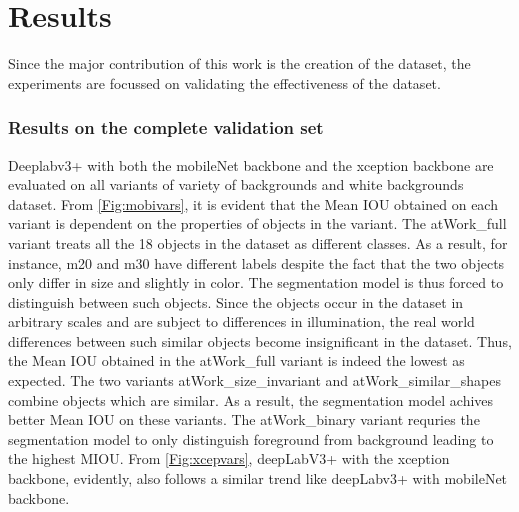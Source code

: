 
\chapter{Results}

Since the major contribution of this work is the creation of the dataset, the experiments are focussed on validating the effectiveness of the dataset. 


\subsection{Results on the complete validation set}


Deeplabv3+ with both the mobileNet backbone and the xception backbone are evaluated on all variants of variety of backgrounds and white backgrounds dataset. From \ref{Fig:mobivars}, it is evident that the Mean IOU obtained on each variant is dependent on the properties of objects in the variant. The atWork\_full variant treats all the 18 objects in the dataset as different classes. As a result, for instance, m20 and m30 have different labels despite the fact that the two objects only differ in size and slightly in color. The segmentation model is thus forced to distinguish between such objects. Since the objects occur in the dataset in arbitrary scales and are subject to differences in illumination, the real world differences between such similar objects become insignificant in the dataset. Thus, the Mean IOU obtained in the atWork\_full variant is indeed the lowest as expected. The two variants atWork\_size\_invariant and atWork\_similar\_shapes combine objects which are similar. As a result, the segmentation model achives better Mean IOU on these variants. The atWork\_binary variant requries the segmentation model to only distinguish foreground from background leading to the highest MIOU. From \ref{Fig:xcepvars}, deepLabV3+ with the xception backbone, evidently, also follows a similar trend like deepLabv3+ with mobileNet backbone.

